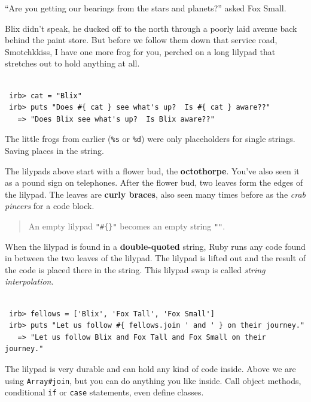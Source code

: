 \documentclass[10pt,twoside]{report}
\begin{document}
``Are you getting our bearings from the stars and planets?'' asked Fox
Small.

Blix didn't speak, he ducked off to the north through a poorly laid
avenue back behind the paint store. But before we follow them down
that service road, Smotchkkiss, I have one more frog for you, perched
on a long lilypad that stretches out to hold anything at all.


\begin{lstlisting}

 irb> cat = "Blix"
 irb> puts "Does #{ cat } see what's up?  Is #{ cat } aware??"
   => "Does Blix see what's up?  Is Blix aware??"

\end{lstlisting}


The little frogs from earlier (\lstinline[breaklines=true]|%s| or
\lstinline[breaklines=true]|%d|) were only placeholders for single
strings.  Saving places in the string.

The lilypads above start with a flower bud, the {\bf octothorpe}.
You've also seen it as a pound sign on telephones.  After the flower
bud, two leaves form the edges of the lilypad.  The leaves are {\bf
  curly braces}, also seen many times before as the {\em crab pincers}
for a code block.

\begin{quote}
An empty lilypad \lstinline[breaklines=true]|"#{}"| becomes an empty
string \lstinline[breaklines=true]|""|.\end{quote}


When the lilypad is found in a {\bf double-quoted} string, Ruby runs
any code found in between the two leaves of the lilypad.  The lilypad
is lifted out and the result of the code is placed there in the
string.  This lilypad swap is called {\em string interpolation}.


\begin{lstlisting}

 irb> fellows = ['Blix', 'Fox Tall', 'Fox Small']
 irb> puts "Let us follow #{ fellows.join ' and ' } on their journey."
   => "Let us follow Blix and Fox Tall and Fox Small on their journey."

\end{lstlisting}


The lilypad is very durable and can hold any kind of code inside.
Above we are using \lstinline[breaklines=true]|Array#join|, but you
can do anything you like inside.  Call object methods, conditional
\lstinline[breaklines=true]|if| or \lstinline[breaklines=true]|case|
statements, even define classes.
\end{document}
